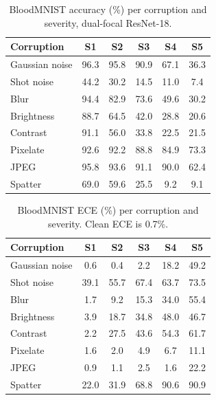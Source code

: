 \documentclass[a4paper,11pt,en,citestyle=authoryear,bibstyle=authoryear]{elegantpaper}
\begin{document}
\begin{table}[H]
  \centering
  \caption{BloodMNIST accuracy (\%) per corruption and severity, dual-focal ResNet-18.}
  \label{tab:blood-acc}
  \begin{tabular}{lccccc}
    \toprule
    Corruption & S1 & S2 & S3 & S4 & S5 \\
    \midrule
    Gaussian noise & 96.3 & 95.8 & 90.9 & 67.1 & 36.3 \\
    Shot noise & 44.2 & 30.2 & 14.5 & 11.0 & 7.4 \\
    Blur & 94.4 & 82.9 & 73.6 & 49.6 & 30.2 \\
    Brightness & 88.7 & 64.5 & 42.0 & 28.8 & 20.6 \\
    Contrast & 91.1 & 56.0 & 33.8 & 22.5 & 21.5 \\
    Pixelate & 92.6 & 92.2 & 88.8 & 84.9 & 73.3 \\
    JPEG & 95.8 & 93.6 & 91.1 & 90.0 & 62.4 \\
    Spatter & 69.0 & 59.6 & 25.5 & 9.2 & 9.1 \\
    \bottomrule
  \end{tabular}
\end{table}

\begin{table}[H]
  \centering
  \caption{BloodMNIST ECE (\%) per corruption and severity. Clean ECE is 0.7\%.}
  \label{tab:blood-ece}
  \begin{tabular}{lccccc}
    \toprule
    Corruption & S1 & S2 & S3 & S4 & S5 \\
    \midrule
    Gaussian noise & 0.6 & 0.4 & 2.2 & 18.2 & 49.2 \\
    Shot noise & 39.1 & 55.7 & 67.4 & 63.7 & 73.5 \\
    Blur & 1.7 & 9.2 & 15.3 & 34.0 & 55.4 \\
    Brightness & 3.9 & 18.7 & 34.8 & 48.0 & 46.7 \\
    Contrast & 2.2 & 27.5 & 43.6 & 54.3 & 61.7 \\
    Pixelate & 1.6 & 2.0 & 4.9 & 6.7 & 11.1 \\
    JPEG & 0.9 & 1.1 & 2.5 & 1.6 & 22.2 \\
    Spatter & 22.0 & 31.9 & 68.8 & 90.6 & 90.9 \\
    \bottomrule
  \end{tabular}
\end{table}
\end{document}
